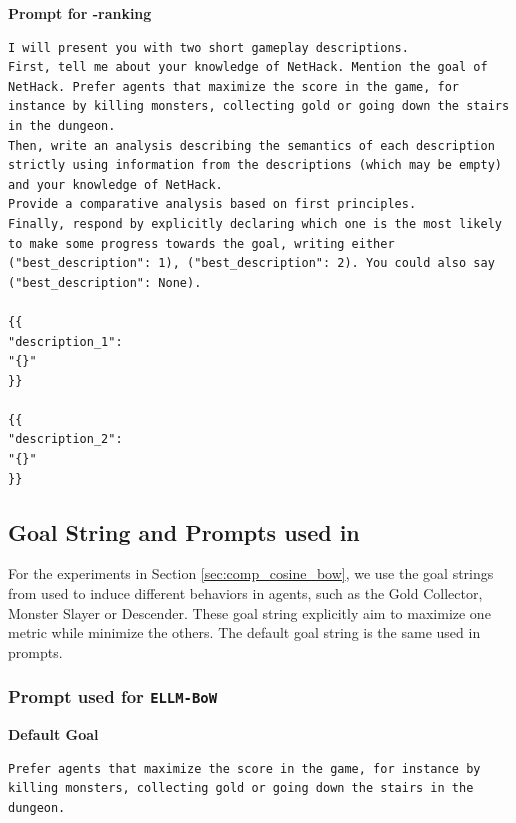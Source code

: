 \clearpage
\textbf{Prompt for \oni-ranking}

\begin{lstlisting}
I will present you with two short gameplay descriptions.
First, tell me about your knowledge of NetHack. Mention the goal of NetHack. Prefer agents that maximize the score in the game, for instance by killing monsters, collecting gold or going down the stairs in the dungeon.
Then, write an analysis describing the semantics of each description strictly using information from the descriptions (which may be empty) and your knowledge of NetHack.
Provide a comparative analysis based on first principles.
Finally, respond by explicitly declaring which one is the most likely to make some progress towards the goal, writing either ("best_description": 1), ("best_description": 2). You could also say ("best_description": None).

{{
"description_1":
"{}"
}}

{{
"description_2":
"{}"
}}
\end{lstlisting}



%
%
%
%
%
%
%
%
%
%
%
%
%
%
%
%
%
%
%
%
%
%



\subsection{Goal String and Prompts used in }

For the experiments in Section \ref{sec:comp_cosine_bow}, we use the goal strings from \cite{klissarovdoro2023motif} used to induce different behaviors in agents, such as the Gold Collector, Monster Slayer or Descender. These goal string explicitly aim to maximize one metric while minimize the others. The default goal string is the same used in \oni prompts. 
\label{app:goal_strings}

%
%
%
%
%
%
%
%
%
%
%
%
%
%
%
%
%

\subsubsection{Prompt used for \texttt{ELLM-BoW}}
\label{app:goal_string_cosine_bow}

\textbf{Default Goal} \begin{lstlisting}
Prefer agents that maximize the score in the game, for instance by killing monsters, collecting gold or going down the stairs in the dungeon.
\end{lstlisting}


